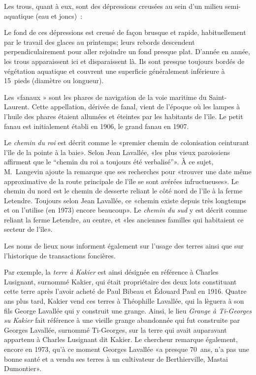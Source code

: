 \documentclass[12pt]{article}
\begin{document}
Les trous, quant à eux, sont des dépressions creusées au sein d'un milieu semi-aquatique (eau et joncs) :
\begin{blockquote}
Le fond de ces dépressions est creusé de façon brusque et rapide, habituellement par le travail des glaces au printemps; leurs rebords descendent perpendiculairement pour aller rejoindre un fond presque plat. D'année en année, les trous apparaissent ici et disparaissent là. Ils sont presque toujours bordés de végétation aquatique et couvrent une superficie généralement inférieure à 15 pieds (diamètre ou longueur). \end{blockquote}

Les «fanaux » sont les phares de navigation de la voie maritime du Saint-Laurent. Cette appellation, dérivée de fanal, vient de l'époque où les lampes à l'huile des phares étaient allumées et éteintes par les habitants de l'île. Le petit fanau est initialement établi en 1906, le grand fanau en 1907.

Le \emph{chemin du roi} est décrit comme le «premier chemin de colonisation ceinturant l'île de la pointe à la baie». Selon Jean Lavallée, «les plus vieux paroissiens affirment que le “chemin du roi a toujours été verbalisé”». À ce sujet, M. Langevin ajoute la remarque que ses recherches pour «trouver une date même approximative de la route principale de l'île se sont avérées infructueuses». Le chemin du nord est le chemin de desserte reliant le côté nord de l'île à la ferme Letendre. Toujours selon Jean Lavallée, ce «chemin existe depuis très longtemps et on l'utilise (en 1973) encore beaucoup». Le \emph{chemin du sud} y est décrit comme reliant la ferme Letendre, au centre, et «les anciennes familles qui habitaient ce secteur de l'île».

Les noms de lieux nous informent également sur l'usage des terres ainsi que sur l'historique de transactions foncières.

Par exemple, la \emph{terre à Kakier} est ainsi désignée en référence à Charles Lusignant, surnommé Kakier, qui était propriétaire des deux lots constituant cette terre après l'avoir acheté de Paul Bibeau et Édouard Paul en 1916. Quatre ans plus tard, Kakier vend ces terres à Théophille Lavallée, qui la lèguera à son fils George Lavallée qui y construit une grange. Ainsi, le lieu \emph{Grange à Ti-Georges su Kakier} fait référence à une vieille grange abandonnée qui fut construite par Georges Lavallée, surnommé Ti-Georges, sur la terre qui avait auparavant appartenu à Charles Lusignant dit Kakier. Le chercheur remarque également, encore en 1973, qu'à ce moment Georges Lavallée «a presque 70 ans, n'a pas une bonne santé et a vendu ses terres à un cultivateur de Berthierville, Mastai Dumontier».
\end{document}
